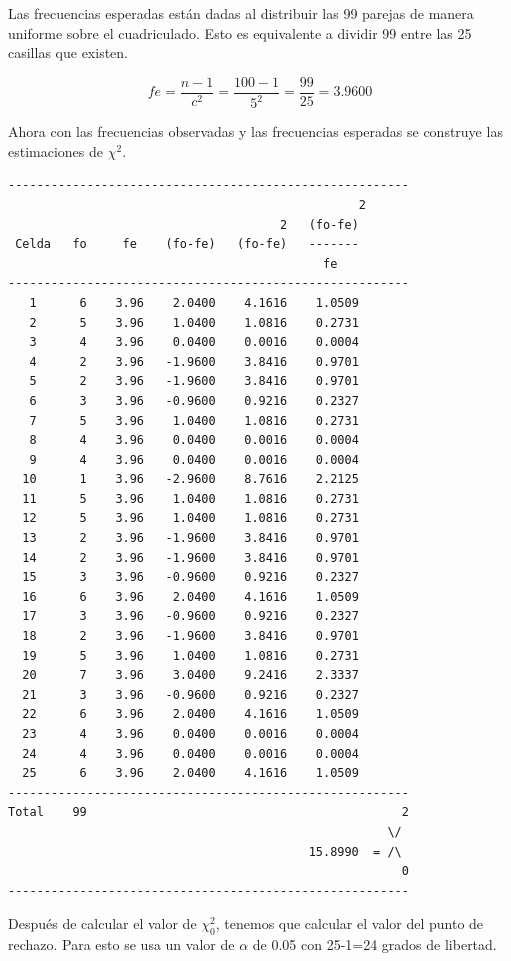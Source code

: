 Las frecuencias esperadas están dadas al distribuir las 99 parejas de manera uniforme sobre el cuadriculado. Esto es equivalente a dividir 99 entre las 25 casillas que existen.

$$fe = \frac{n-1}{c^2} = \frac{100-1}{5^2} =\frac{99}{25} = 3.9600$$


Ahora con las frecuencias observadas y las frecuencias esperadas se construye las estimaciones de $\chi^2$.

\begin{verbatim}
--------------------------------------------------------
                                                 2
                                      2   (fo-fe)
 Celda   fo     fe    (fo-fe)   (fo-fe)   -------
                                            fe
--------------------------------------------------------
   1      6    3.96    2.0400    4.1616    1.0509
   2      5    3.96    1.0400    1.0816    0.2731
   3      4    3.96    0.0400    0.0016    0.0004
   4      2    3.96   -1.9600    3.8416    0.9701
   5      2    3.96   -1.9600    3.8416    0.9701
   6      3    3.96   -0.9600    0.9216    0.2327
   7      5    3.96    1.0400    1.0816    0.2731
   8      4    3.96    0.0400    0.0016    0.0004
   9      4    3.96    0.0400    0.0016    0.0004
  10      1    3.96   -2.9600    8.7616    2.2125
  11      5    3.96    1.0400    1.0816    0.2731
  12      5    3.96    1.0400    1.0816    0.2731
  13      2    3.96   -1.9600    3.8416    0.9701
  14      2    3.96   -1.9600    3.8416    0.9701
  15      3    3.96   -0.9600    0.9216    0.2327
  16      6    3.96    2.0400    4.1616    1.0509
  17      3    3.96   -0.9600    0.9216    0.2327
  18      2    3.96   -1.9600    3.8416    0.9701
  19      5    3.96    1.0400    1.0816    0.2731
  20      7    3.96    3.0400    9.2416    2.3337
  21      3    3.96   -0.9600    0.9216    0.2327
  22      6    3.96    2.0400    4.1616    1.0509
  23      4    3.96    0.0400    0.0016    0.0004
  24      4    3.96    0.0400    0.0016    0.0004
  25      6    3.96    2.0400    4.1616    1.0509
--------------------------------------------------------
Total    99                                            2
                                                     \/
                                          15.8990  = /\
                                                       0
--------------------------------------------------------
\end{verbatim}


Después de calcular el valor de $\chi^2_0$, tenemos que calcular el valor del punto de rechazo. Para esto se usa un valor de $\alpha$ de 0.05 con 25-1=24 grados de libertad.

